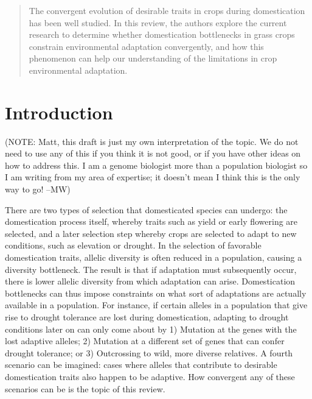 \documentclass[12pt]{article}
\begin{document}
\maketitle

\begin{abstract}
The convergent evolution of desirable traits in crops during domestication has been well studied. In this review, the authors explore the current research to determine whether domestication bottlenecks in grass crops constrain environmental adaptation convergently, and how this phenomenon can help our understanding of the limitations in crop environmental adaptation.
\end{abstract}

\section{Introduction}
(NOTE: Matt, this draft is just my own interpretation of the topic. We do not need to use any of this if you think it is not good, or if you have other ideas on how to address this. I am a genome biologist more than a population biologist so I am writing from my area of expertise; it doesn't mean I think this is the only way to go! --MW)

There are two types of selection that domesticated species can undergo: the domestication process itself, whereby traits such as yield or early flowering are selected, and a later selection step whereby crops are selected to adapt to new conditions, such as elevation or drought. In the selection of favorable domestication traits, allelic diversity is often reduced in a population, causing a diversity bottleneck. The result is that if adaptation must subsequently occur, there is lower allelic diversity from which adaptation can arise. Domestication bottlenecks can thus impose constraints on what sort of adaptations are actually available in a population. For instance, if certain alleles in a population that give rise to drought tolerance are lost during domestication, adapting to drought conditions later on can only come about by 1) Mutation at the genes with the lost adaptive alleles; 2) Mutation at a different set of genes that can confer drought tolerance; or 3) Outcrossing to wild, more diverse relatives. A fourth scenario can be imagined: cases where alleles that contribute to desirable domestication traits also happen to be adaptive. How convergent any of these scenarios can be is the topic of this review.\paragraph{}
\end{document}
